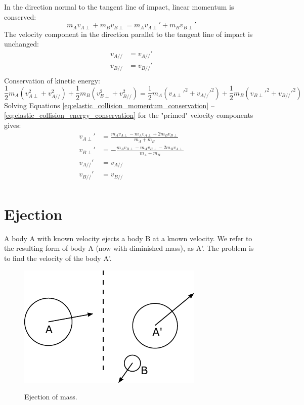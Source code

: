 \documentclass{article}
\begin{document}
In the direction normal to the tangent line of impact, linear momentum is conserved:
\begin{equation}
\label{eq:elastic_collision_momentum_conservation}
m_Av_{A\perp} + m_Bv_{B\perp} = m_Av_{A\perp}' + m_Bv_{B\perp}'
\end{equation}
The velocity component in the direction parallel to the tangent line of impact is unchanged:
\begin{equation}
\begin{split}
v_{A//} &= v_{A//}'\\
v_{B//} &= v_{B//}'\\
\end{split}
\end{equation}
Conservation of kinetic energy:
\begin{equation}
\label{eq:elastic_collision_energy_conservation}
\frac{1}{2}m_A(v_{A\perp}^2+v_{A//}^2) + \frac{1}{2}m_B(v_{B\perp}^2+v_{B//}^2) = \frac{1}{2}m_A(v_{A\perp}'^2+v_{A//}'^2) + \frac{1}{2}m_B(v_{B\perp}'^2+v_{B//}'^2)
\end{equation}
Solving Equations \ref{eq:elastic_collision_momentum_conservation} -- \ref{eq:elastic_collision_energy_conservation} for the "primed" velocity components gives:
\begin{equation}
\begin{split}
v_{A\perp}' &= \frac{m_Av_{A\perp} - m_Av_{A\perp} + 2m_Bv_{B\perp}}{m_A+m_B}\\
v_{B\perp}' &= -\frac{m_Av_{B\perp} - m_Av_{B\perp} - 2m_Bv_{A\perp}}{m_A+m_B}\\
v_{A//}' &= v_{A//}\\
v_{B//}' &= v_{B//}\\
\end{split}
\end{equation}







\section{Ejection}
A body A with known velocity ejects a body B at a known velocity. We refer to the resulting form of body A (now with diminished mass), as A'. The problem is to find the velocity of the body A'.

\begin{figure}[h]
	\centering
	{\includegraphics{figures/ejection.pdf}}
	\caption{Ejection of mass.}\label{fig:ejection}
\end{figure}
\end{document}
